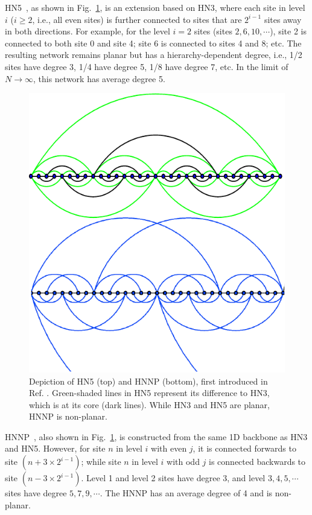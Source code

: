 HN5~\cite{Boettcher09c}, as shown in Fig.~\ref{fig:Depiction-of-HN},
is an extension based on HN3, where each site in level $i$ ($i\ge2$,
i.e., all even sites) is further connected to sites that are $2^{i-1}$
sites away in both directions. For example, for the level $i=2$ sites
(sites $2,6,10,\cdots$), site 2 is connected to both site 0 and site
4; site 6 is connected to sites 4 and 8; etc. The resulting network
remains planar but has a hierarchy-dependent degree, i.e., 1/2 sites
have degree 3, 1/4 have degree 5, 1/8 have degree 7, etc. In the limit
of $N\to\infty$, this network has  average degree 5.

\begin{figure}
\centering\includegraphics[width=0.8\columnwidth]{Chapter-1/HN5HNNP}
\protect\caption{\label{fig:Depiction-of-HN}Depiction of HN5 (top) and HNNP (bottom),
first introduced in Ref. \protect\cite{Boettcher09c}. Green-shaded lines
in HN5 represent its difference to HN3, which is at its core (dark
lines). While HN3 and HN5 are planar, HNNP is non-planar. }
\end{figure}

HNNP~\cite{Boettcher09c}, also shown in Fig.~\ref{fig:Depiction-of-HN},
is constructed from the same 1D backbone as HN3 and HN5. However,
for site $n$ in level $i$ with even $j$, it is connected forwards
to site $(n+3\times2^{i-1})$; while site $n$ in level $i$ with
odd $j$ is connected backwards to site $(n-3\times2^{i-1})$. Level
1 and level 2 sites have degree 3, and level $3,4,5,\cdots$ sites
have degree $5,7,9,\cdots$. The HNNP has an average degree of 4 and
is non-planar.

